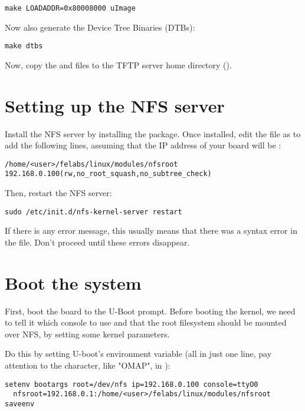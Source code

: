 \begin{verbatim}
make LOADADDR=0x80008000 uImage
\end{verbatim}

Now also generate the Device Tree Binaries (DTBs):

\begin{verbatim}
make dtbs
\end{verbatim}

Now, copy the  and  files
to the TFTP server home directory ().

\section{Setting up the NFS server}

Install the NFS server by installing the 
package. Once installed, edit the  file as
 to add the following lines, assuming that the IP address
of your board will be :

\scriptsize
\begin{verbatim}
/home/<user>/felabs/linux/modules/nfsroot 192.168.0.100(rw,no_root_squash,no_subtree_check)
\end{verbatim}
\normalsize

Then, restart the NFS server:

\begin{verbatim}
sudo /etc/init.d/nfs-kernel-server restart
\end{verbatim}

If there is any error message, this usually means that there was a
syntax error in the  file. Don't proceed until these
errors disappear.

\section{Boot the system}

First, boot the board to the U-Boot prompt. Before booting the kernel,
we need to tell it which console to use and that the root filesystem
should be mounted over NFS, by setting some kernel parameters.

Do this by setting U-boot's  environment variable (all in
just one line, pay attention to the  character, like "OMAP", in
): 

\begin{verbatim}
setenv bootargs root=/dev/nfs ip=192.168.0.100 console=ttyO0
  nfsroot=192.168.0.1:/home/<user>/felabs/linux/modules/nfsroot
saveenv
\end{verbatim}


